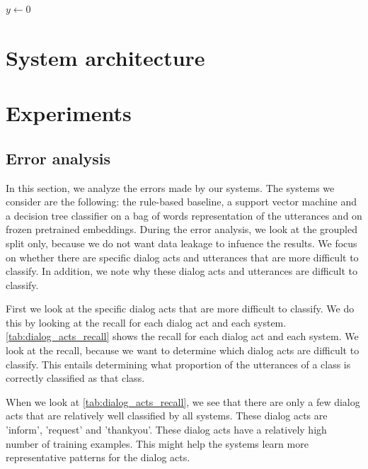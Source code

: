 \documentclass{midl} %
\begin{document}
\begin{algorithm2e}
\caption{Computing Net Activation}
\label{alg:net}
{}
$y\leftarrow 0$\;
\end{algorithm2e}

\section{System architecture}

\section{Experiments}

\subsection{Error analysis}
In this section, we analyze the errors made by our systems. 
The systems we consider are the following: the rule-based baseline, 
a support vector machine and a decision tree classifier on a bag of words representation of the utterances and on frozen pretrained embeddings.
During the error analysis, we look at the groupled split only, because we do not want data leakage to infuence the results.
We focus on whether there are specific dialog acts and utterances that are more difficult to classify.
In addition, we note why these dialog acts and utterances are difficult to classify.\newline

First we look at the specific dialog acts that are more difficult to classify.
We do this by looking at the recall for each dialog act and each system.
\autoref{tab:dialog_acts_recall} shows the recall for each dialog act and each system.
We look at the recall, because we want to determine which dialog acts are difficult to classify.
This entails determining what proportion of the utterances of a class is correctly classified as that class.\newline

When we look at \autoref{tab:dialog_acts_recall}, we see that there are only a few dialog acts that 
are relatively well classified by all systems. These dialog acts are 'inform', 'request' and 'thankyou'.
These dialog acts have a relatively high number of training examples. 
This might help the systems learn more representative patterns for the dialog acts.\newline
\end{document}
